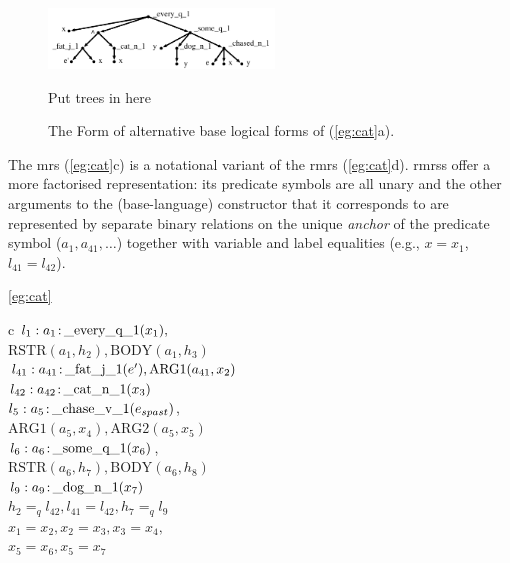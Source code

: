 \begin{figure}[h]

\includegraphics[width=6cm]{pic-cat-chased-dog}

Put trees in here

\caption{The Form of alternative base logical forms of
  (\ref{eg:cat}a).}
\label{fig:1}
\end{figure}

The {\sc mrs} (\ref{eg:cat}c) is a notational variant of the {\sc
  rmrs} (\ref{eg:cat}d). {\sc rmrs}s offer a more factorised
representation: its predicate symbols are all unary and the other
arguments to the (base-language) constructor that it corresponds to
are represented by separate binary relations on the unique {\em
  anchor} of the predicate symbol ($a_1, a_{41},\ldots$) together with
variable and label equalities (e.g., $x=x_1$, $l_{41}=l_{42}$).
\begin{examples}
\item   [\ref{eg:cat}]
\begin{subexamples}
\item   [c]
$l_1:a_1\colon\!\mbox{\_every\_q\_1}(x_1),$\\
\hspace*{0.1in}$\mbox{RSTR}(a_1,h_2),
\mbox{BODY}(a_1,h_3)$\\ 
$l_{41}:a_{41}\colon\!\mbox{\_fat\_j\_1}(e'), \mbox{ARG1}(a_{41},x_2)$\\
$l_{42}:a_{42}\colon\!\mbox{\_cat\_n\_1}(x_3)$\\
$l_5:a_5\colon\!\mbox{\_chase\_v\_1}(e_{spast})$,\\
\hspace*{0.1in}$\mbox{ARG1}(a_5,x_4),
\mbox{ARG2}(a_5,x_5)$\\ 
$l_6:a_6\colon\!\mbox{\_some\_q\_1}(x_6)$,\\
\hspace*{0.1in}$\mbox{RSTR}(a_6,h_7),
\mbox{BODY}(a_6,h_8)$\\ 
$l_9:a_9\colon\!\mbox{\_dog\_n\_1}(x_7)$\\
$h_2=_q l_{42}, l_{41}=l_{42}, h_7 =_q l_9$\\
$x_1=x_2, x_2=x_3, x_3=x_4,$\\
$x_5=x_6, x_5=x_7$
\end{subexamples}
\end{examples}

